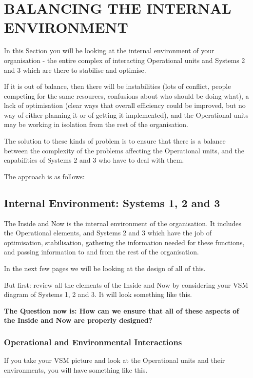 \chapter{BALANCING THE INTERNAL ENVIRONMENT}
  \label{BALANCING THE INTERNAL ENVIRONMENT}
In this Section you will be looking at the internal environment of your organisation - the entire complex of interacting Operational units and Systems 2 and 3 which are there to stabilise and optimise.

If it is out of balance, then there will be instabilities (lots of conflict, people competing for the same resources, confusions about who should be doing what), a lack of optimisation (clear ways that overall efficiency could be improved, but no way of either planning it or of getting it implemented), and the Operational units may be working in isolation from the rest of the organisation.

The solution to these kinds of problem is to ensure that there is a balance between the complexity of the problems affecting the Operational units, and the capabilities of Systems 2 and 3 who have to deal with them.

The approach is as follows:


\section*{Internal Environment: Systems 1, 2 and 3}
The Inside and Now is the internal environment of the organisation. It includes the Operational elements, and Systems 2 and 3 which have the job of optimisation, stabilisation, gathering the information needed for these functions, and passing information to and from the rest of the organisation.

In the next few pages we will be looking at the design of all of this.

But first: review all the elements of the Inside and Now by considering your VSM diagram of Systems 1, 2 and 3. It will look something like this.

\textbf{The Question now is:
How can we ensure that all of these aspects of the Inside and Now are properly designed?}

\subsection*{Operational and Environmental Interactions}
If you take your VSM picture and look at the Operational units and their environments, you will have something like this.

